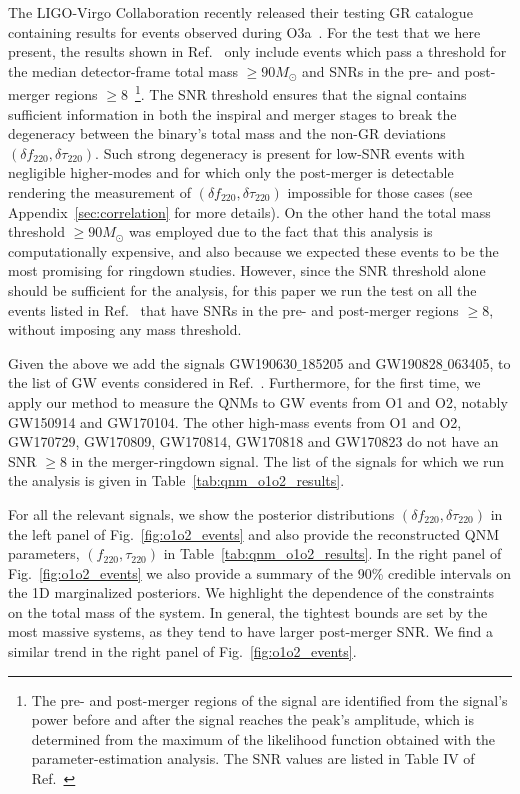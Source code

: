 \documentclass[twocolumn,prd,aps,superscriptaddress,preprintnumbers,tightenlines,showpacs,nofootinbib,eqsecnum,amsfonts,amsmath]{revtex4-1}
\newcommand{\Mo}{M_{\odot}}
\newcommand{\df}[1]{\delta f_{\text{#1}}}
\newcommand{\dtau}[1]{\delta \tau_{\text{#1}}}
\newcommand{\fngr}[1]{f_{\text{#1}}}
\newcommand{\taungr}[1]{\tau_{\text{#1}}}
\begin{document}
The LIGO-Virgo Collaboration recently released their testing GR
catalogue containing results for events observed
during O3a~\cite{Abbott:2020jks}. For the test that we here present, the results shown in Ref.~\cite{Abbott:2020jks} only include events which pass a threshold for the median detector-frame total mass $\geq 90 \Mo$ and SNRs in the pre- and
post-merger regions $\geq 8$~\footnote{The pre- and post-merger regions of the signal are identified from the signal's power before and after the signal reaches the peak's amplitude, which is determined from the maximum of the likelihood function obtained with the parameter-estimation analysis. The SNR values are listed in Table IV of Ref.~\cite{Abbott:2020jks}}. 
%
The SNR threshold ensures that the signal contains sufficient
information in both the inspiral and merger stages to break the
degeneracy between the binary's total mass and the non-GR deviations
$(\df{220}, \dtau{220})$. Such strong degeneracy is present for
low-SNR events with negligible higher-modes and for which only the
post-merger is detectable rendering the measurement of $(\df{220},
\dtau{220})$ impossible for those cases (see Appendix~\ref{sec:correlation} for more details). On the other hand the
total mass threshold $\geq 90 \Mo$ was employed due to the fact that
this analysis is computationally expensive, and also because we
expected these events to be the most promising for ringdown
studies. However, since the SNR threshold alone should be sufficient
for the analysis, for this paper we run the test on all the events
listed in Ref.~\cite{Abbott:2020jks} that have SNRs in the pre- and
post-merger regions $\geq 8$, without imposing any mass threshold.

Given the above we add the signals  GW190630$\_$185205 and GW190828$\_$063405, to the list of GW events considered in Ref.~\cite{Abbott:2020jks}. Furthermore, for the first time, 
we apply our method to measure the QNMs to GW events from O1 and O2, notably GW150914 and GW170104. The other high-mass events from O1 and O2, GW170729, GW170809,
GW170814, GW170818 and GW170823 do not have an SNR $\geq 8$ in the
merger-ringdown signal. The list of the signals for which we run the analysis is given in Table~\ref{tab:qnm_o1o2_results}.
  
For all the relevant signals, we show the posterior distributions
$(\df{220}, \dtau{220})$ in the left panel of
Fig.~\ref{fig:o1o2_events} and also provide the reconstructed QNM
parameters, $(\fngr{220}, \taungr{220})$ in
Table~\ref{tab:qnm_o1o2_results}. In the right panel of
Fig.~\ref{fig:o1o2_events} we also provide a summary of the 90\%
credible intervals on the 1D marginalized posteriors. We highlight the
dependence of the constraints on the total mass of the
system. In general, the tightest bounds are set by the 
most massive systems, as they tend to have larger post-merger SNR. We
find a similar trend in the right panel of Fig.~\ref{fig:o1o2_events}.
 
\end{document}
